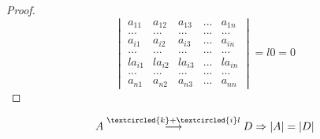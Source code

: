 \documentclass[blue,normal,cn]{elegantnote}
\begin{document}
\begin{proof}
    $$
        \begin{vmatrix} 
            a_{11}&a_{12} & a_{13} &...& a_{1n}\\
            ...&...&...&...&...\\
            a_{i1}&a_{i2} & a_{i3} &...& a_{in}\\
            ...&...&...&...&...\\
            la_{i1}&la_{i2} & la_{i3} &...& la_{in}\\
            ...&...&...&...&...\\
            a_{n1}&a_{n2} & a_{n3} &...& a_{nn}
            \end{vmatrix}
        =l0=0
        $$
\end{proof}

\begin{property}
   $$
    A\stackrel{\textcircled{k}+\textcircled{i}l}{\longrightarrow}D \Rightarrow |A|=|D|
    $$
\end{property}
\end{document}
